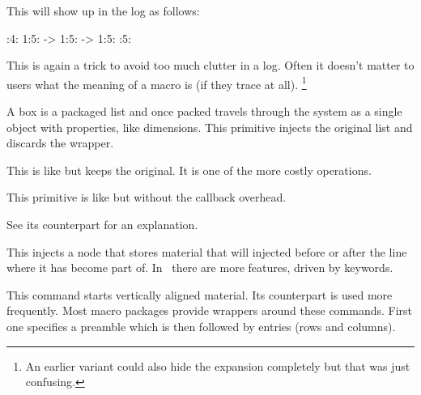 \starttyping
         \def\foo{}
\untraced\def\oof{}

\scratchtoks{\foo\foo\oof\oof}

\tracingall \the\scratchtoks \tracingnone
\stoptyping

This will show up in the log as follows:

:4: {\the}
1:5: \foo ->
1:5: \foo ->
1:5: :5: \oof
\stoptyping

This is again a trick to avoid too much clutter in a log. Often it doesn't matter
to users what the meaning of a macro is (if they trace at all). \footnote {An
earlier variant could also hide the expansion completely but that was just
confusing.}

\stopnewprimitive

\startoldprimitive[title={\prm {unvbox}}]

A box is a packaged list and once packed travels through the system as a single
object with properties, like dimensions. This primitive injects the original list
and discards the wrapper.

\stopoldprimitive

\startoldprimitive[title={\prm {unvcopy}}]

This is like  but keeps the original. It is one of the more costly
operations.

\stopoldprimitive

\startnewprimitive[title={\prm {unvpack}}]

This primitive is like  but without the callback overhead.

\stopnewprimitive

\startoldprimitive[title={\prm {uppercase}}]

See its counterpart  for an explanation.

\stopoldprimitive

\startoldprimitive[title={\prm {vadjust}}]

This injects a node that stores material that will injected before or after the
line where it has become part of. In \LUAMETATEX\ there are more features, driven
by keywords.

\stopoldprimitive

\startoldprimitive[title={\prm {valign}}]

This command starts vertically aligned material. Its counterpart  is
used more frequently. Most macro packages provide wrappers around these commands.
First one specifies a preamble which is then followed by entries (rows and
columns).

